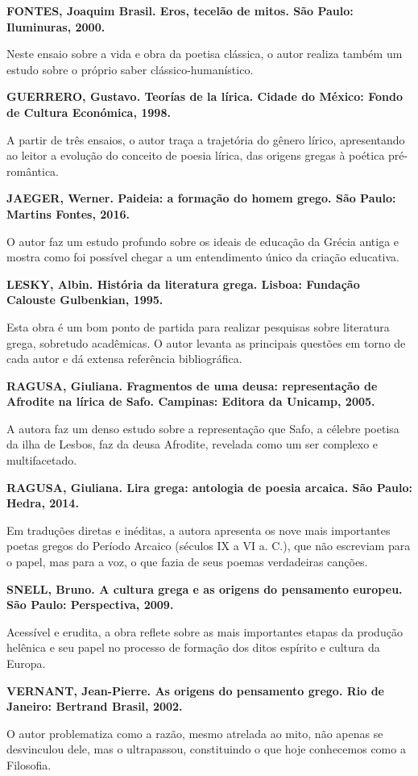 \documentclass[12pt]{extarticle}
\begin{document}
\textbf{FONTES, Joaquim Brasil. Eros, tecelão de mitos. São Paulo:
Iluminuras, 2000.}

Neste ensaio sobre a vida e obra da poetisa clássica, o autor realiza
também um estudo sobre o próprio saber clássico-humanístico.

\textbf{GUERRERO, Gustavo. Teorías de la lírica. Cidade do México: Fondo
de Cultura Económica, 1998.}

A partir de três ensaios, o autor traça a trajetória do gênero lírico,
apresentando ao leitor a evolução do conceito de poesia lírica, das
origens gregas à poética pré-romântica.

\textbf{JAEGER, Werner. Paideia: a formação do homem grego. São Paulo:
Martins Fontes, 2016.}

O autor faz um estudo profundo sobre os ideais de educação da Grécia
antiga e mostra como foi possível chegar a um entendimento único da
criação educativa.

\textbf{LESKY, Albin. História da literatura grega. Lisboa: Fundação
Calouste Gulbenkian, 1995.}

Esta obra é um bom ponto de partida para realizar pesquisas sobre
literatura grega, sobretudo acadêmicas. O autor levanta as principais
questões em torno de cada autor e dá extensa referência bibliográfica.

\textbf{RAGUSA, Giuliana. Fragmentos de uma deusa: representação de
Afrodite na lírica de Safo. Campinas: Editora da Unicamp, 2005. }

A autora faz um denso estudo sobre a representação que Safo, a célebre
poetisa da ilha de Lesbos, faz da deusa Afrodite, revelada como um ser
complexo e multifacetado.

\textbf{RAGUSA, Giuliana. Lira grega: antologia de poesia arcaica. São
Paulo: Hedra, 2014.}

Em traduções diretas e inéditas, a autora apresenta os nove mais
importantes poetas gregos do Período Arcaico (séculos IX a VI a. C.),
que não escreviam para o papel, mas para a voz, o que fazia de seus
poemas verdadeiras canções.

\textbf{SNELL, Bruno. A cultura grega e as origens do pensamento
europeu. São Paulo: Perspectiva, 2009.}

Acessível e erudita, a obra reflete sobre as mais importantes etapas da
produção helênica e seu papel no processo de formação dos ditos espírito
e cultura da Europa.

\textbf{VERNANT, Jean-Pierre. As origens do pensamento grego. Rio de
Janeiro: Bertrand Brasil, 2002.}

O autor problematiza como a razão, mesmo atrelada ao mito, não apenas se
desvinculou dele, mas o ultrapassou, constituindo o que hoje conhecemos
como a Filosofia.
\end{document}
